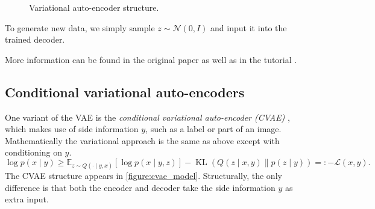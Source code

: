 \documentclass[10pt]{article}
\newcommand{\op}[1]{\operatorname{#1}}
\newcommand{\E}{\mathbb{E}}
\begin{document}
\begin{figure}[!ht]
\centering
{}
\caption{Variational auto-encoder structure.}
\label{figure:vae_model}
\end{figure}

To generate new data, we simply sample $z \sim \mathcal{N}(0,I)$ and input it into the trained decoder.

More information can be found in the original paper \cite{kingma2013auto} as well as in the tutorial \cite{doersch2016tutorial}.


\subsection{Conditional variational auto-encoders}

One variant of the VAE is the \emph{conditional variational auto-encoder (CVAE)} \cite{sohn2015learning}, which makes use of side information $y$, such as a label or part of an image. Mathematically the variational approach is the same as above except with conditioning on $y$.
\begin{equation}
\log p(x \mid y)
\ge \E_{z \sim Q(\cdot \mid y,x)}[\log p(x \mid y,z)]
- \op{KL}(Q(z \mid x,y) \| p(z \mid y))=: -\mathcal{L}(x,y).
\end{equation}
The CVAE structure appears in \autoref{figure:cvae_model}. Structurally, the only difference is that both the encoder and decoder take the side information $y$ as extra input.
\end{document}
